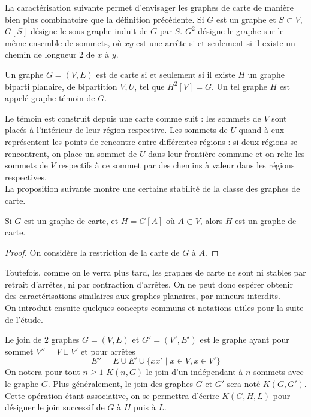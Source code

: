 \documentclass{scrartcl}
\begin{document}
\begin{flushleft}
La caractérisation suivante permet d'envisager les graphes de carte de manière bien plus combinatoire que la définition précédente.
Si $G$ est un graphe et $S \subset V$, $G[S]$ désigne le sous graphe induit de $G$ par $S$. $G^2$ désigne le graphe sur le même
ensemble de sommets, où $xy$ est une arrête si et seulement si il existe un chemin de longueur $2$ de $x$ à $y$.

\begin{theorem}\label{carCarte}
    Un graphe $G = (V, E)$ est de carte si et seulement si il existe $H$ un graphe biparti planaire, de bipartition $V, U$,
    tel que $H^2[V] = G$. Un tel graphe $H$ est appelé graphe témoin de $G$.
\end{theorem}

Le témoin est construit depuis une carte comme suit : les sommets de $V$ sont placés à l'intérieur de leur région respective.
Les sommets de $U$ quand à eux représentent les points de rencontre entre différentes régions : si deux régions se rencontrent, on place
un sommet de $U$ dans leur frontière commune et on relie les sommets de $V$ respectifs à ce sommet par des chemins à valeur
dans les régions respectives.\\
La proposition suivante montre une certaine stabilité de la classe des graphes de carte.

\begin{prop}
    Si $G$ est un graphe de carte, et $H = G[A]$ où $A \subset V$, alors $H$ est un graphe de carte.
\end{prop}

\begin{proof}
    On considère la restriction de la carte de $G$ à $A$.
\end{proof}

Toutefois, comme on le verra plus tard, les graphes de carte ne sont ni stables par retrait d'arrêtes, ni par contraction d'arrêtes.
On ne peut donc espérer obtenir des caractérisations similaires aux graphes planaires, par mineurs interdits.\\
On introduit ensuite quelques concepts communs et notations utiles pour la suite de l'étude.

\begin{def*}[Join]
    Le join de $2$ graphes $G = (V, E)$ et $G' = (V', E')$ est le graphe ayant pour sommet $V'' = V \sqcup V'$ et pour arrêtes
    \[ E'' = E \cup E' \cup \{ xx' \mid x \in V, x \in V' \} \]
    On notera pour tout $n \geq 1$ $K(n, G)$ le join d'un indépendant à $n$ sommets avec le graphe $G$. Plus généralement,
    le join des graphes $G$ et $G'$ sera noté $K(G, G')$. Cette opération étant associative, on se permettra
    d'écrire $K(G, H, L)$ pour désigner le join successif de $G$ à $H$ puis à $L$.
\end{def*}


\end{flushleft}
\end{document}
